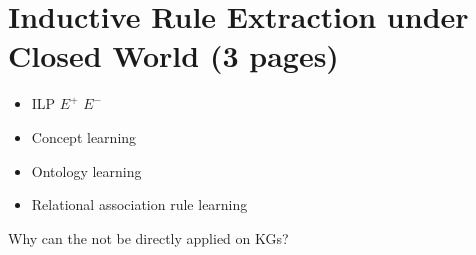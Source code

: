 \section{Inductive Rule Extraction under Closed World (3 pages)}
\label{sec:rulelearn}

\begin{itemize}
\item ILP $E^+$ $E^-$
\item Concept learning
\item Ontology learning
\item Relational  association rule learning
\end{itemize}



Why can the not be directly applied on KGs?

